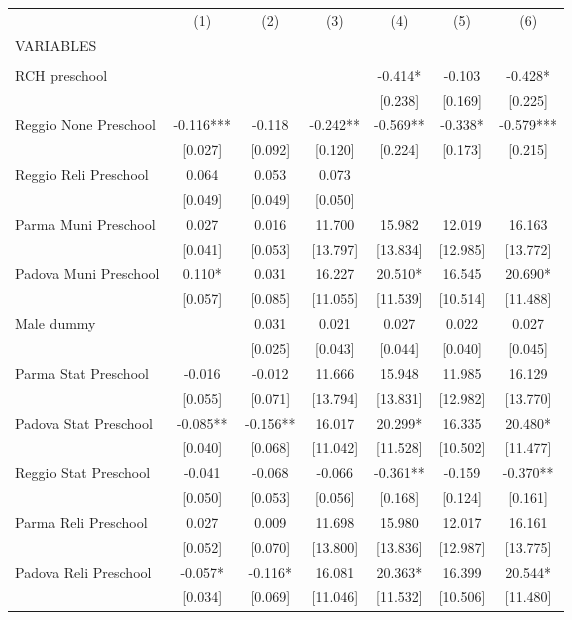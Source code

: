 \begin{tabular}{lcccccc} \hline
 & (1) & (2) & (3) & (4) & (5) & (6) \\
VARIABLES &  &  &  &  &  &  \\ \hline
 &  &  &  &  &  &  \\
RCH preschool &  &  &  & -0.414* & -0.103 & -0.428* \\
 &  &  &  & [0.238] & [0.169] & [0.225] \\
Reggio None Preschool & -0.116*** & -0.118 & -0.242** & -0.569** & -0.338* & -0.579*** \\
 & [0.027] & [0.092] & [0.120] & [0.224] & [0.173] & [0.215] \\
Reggio Reli Preschool & 0.064 & 0.053 & 0.073 &  &  &  \\
 & [0.049] & [0.049] & [0.050] &  &  &  \\
Parma Muni Preschool & 0.027 & 0.016 & 11.700 & 15.982 & 12.019 & 16.163 \\
 & [0.041] & [0.053] & [13.797] & [13.834] & [12.985] & [13.772] \\
Padova Muni Preschool & 0.110* & 0.031 & 16.227 & 20.510* & 16.545 & 20.690* \\
 & [0.057] & [0.085] & [11.055] & [11.539] & [10.514] & [11.488] \\
Male dummy &  & 0.031 & 0.021 & 0.027 & 0.022 & 0.027 \\
 &  & [0.025] & [0.043] & [0.044] & [0.040] & [0.045] \\
Parma Stat Preschool & -0.016 & -0.012 & 11.666 & 15.948 & 11.985 & 16.129 \\
 & [0.055] & [0.071] & [13.794] & [13.831] & [12.982] & [13.770] \\
Padova Stat Preschool & -0.085** & -0.156** & 16.017 & 20.299* & 16.335 & 20.480* \\
 & [0.040] & [0.068] & [11.042] & [11.528] & [10.502] & [11.477] \\
Reggio Stat Preschool & -0.041 & -0.068 & -0.066 & -0.361** & -0.159 & -0.370** \\
 & [0.050] & [0.053] & [0.056] & [0.168] & [0.124] & [0.161] \\
Parma Reli Preschool & 0.027 & 0.009 & 11.698 & 15.980 & 12.017 & 16.161 \\
 & [0.052] & [0.070] & [13.800] & [13.836] & [12.987] & [13.775] \\
Padova Reli Preschool & -0.057* & -0.116* & 16.081 & 20.363* & 16.399 & 20.544* \\
 & [0.034] & [0.069] & [11.046] & [11.532] & [10.506] & [11.480] \\

\end{tabular}
